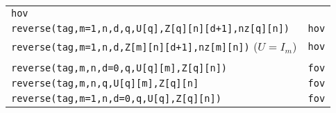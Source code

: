\documentclass[12pt,oneside,a4paper]{article}
\begin{document}
\begin{center}
\begin{tabular}{|p{15.6cm}|p{0.8cm}|}
           {\large {\tt hov}} \\[0.5ex]
{\tt reverse(tag,m=1,n,d,q,U[q],Z[q][n][d+1],nz[q][n])} & 
           {\large {\tt hov}} \\[0.5ex]
{\tt reverse(tag,m=1,n,d,Z[m][n][d+1],nz[m][n])} ($U=I_m$) & 
           {\large {\tt hov}} \\[0.5ex]
\hline& \\[-2.0ex] 
{\tt reverse(tag,m,n,d=0,q,U[q][m],Z[q][n])} & 
           {\large {\tt fov}} \\[0.5ex]
{\tt reverse(tag,m,n,q,U[q][m],Z[q][n]} & 
           {\large {\tt fov}} \\[0.5ex]
{\tt reverse(tag,m=1,n,d=0,q,U[q],Z[q][n])} & 
           {\large {\tt fov}} \\[1.0ex]
\hline
\end{tabular}
%
\end{center}
\end{document}
